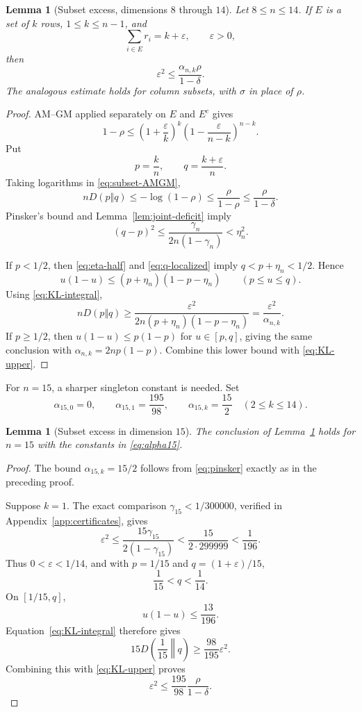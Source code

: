 \documentclass[11pt]{article}
\newtheorem{lemma}[theorem]{Lemma}
\theoremstyle{definition}
\newcommand{\1}{\mathbf{1}}
\newcommand{\eps}{\varepsilon}
\begin{document}
\begin{lemma}[Subset excess, dimensions $8$ through $14$]\label{lem:subset-mid}
Let $8\le n\le14$.  If $E$ is a set of $k$ rows, $1\le k\le n-1$, and
\[
 \sum_{i\in E}r_i=k+\eps,
 \qquad \eps>0,
\]
then
\[
 \eps^2\le\frac{\alpha_{n,k}\rho}{1-\delta}.
 \tag{5.13}\label{eq:subset-mid}
\]
The analogous estimate holds for column subsets, with $\sigma$ in place of $\rho$.
\end{lemma}

\begin{proof}
AM--GM applied separately on $E$ and $E^c$ gives
\[
 1-\rho
 \le
 \left(1+\frac{\eps}{k}\right)^k
 \left(1-\frac{\eps}{n-k}\right)^{n-k}.
 \tag{5.14}\label{eq:subset-AMGM}
\]
Put
\[
 p=\frac{k}{n},
 \qquad
 q=\frac{k+\eps}{n}.
\]
Taking logarithms in \eqref{eq:subset-AMGM},
\[
 nD(p\Vert q)\le-\log(1-\rho)
 \le\frac{\rho}{1-\rho}
 \le\frac{\rho}{1-\delta}.
 \tag{5.15}\label{eq:KL-upper}
\]
Pinsker's bound and Lemma~\ref{lem:joint-deficit} imply
\[
 (q-p)^2
 \le\frac{\gamma_n}{2n(1-\gamma_n)}
 <\eta_n^2.
 \tag{5.16}\label{eq:q-localized}
\]

If $p<1/2$, then \eqref{eq:eta-half} and \eqref{eq:q-localized} imply $q<p+\eta_n<1/2$.  Hence
\[
 u(1-u)\le(p+\eta_n)(1-p-\eta_n)
 \qquad(p\le u\le q).
\]
Using \eqref{eq:KL-integral},
\[
 nD(p\Vert q)
 \ge\frac{\eps^2}
 {2n(p+\eta_n)(1-p-\eta_n)}
 =\frac{\eps^2}{\alpha_{n,k}}.
\]
If $p\ge1/2$, then $u(1-u)\le p(1-p)$ for $u\in[p,q]$, giving the same conclusion with $\alpha_{n,k}=2np(1-p)$.  Combine this lower bound with \eqref{eq:KL-upper}.
\end{proof}

For $n=15$, a sharper singleton constant is needed.  Set
\[
 \alpha_{15,0}=0,
 \qquad
 \alpha_{15,1}=\frac{195}{98},
 \qquad
 \alpha_{15,k}=\frac{15}{2}\quad(2\le k\le14).
 \tag{5.17}\label{eq:alpha15}
\]

\begin{lemma}[Subset excess in dimension $15$]\label{lem:subset15}
The conclusion of Lemma~\ref{lem:subset-mid} holds for $n=15$ with the constants in \eqref{eq:alpha15}.
\end{lemma}

\begin{proof}
The bound $\alpha_{15,k}=15/2$ follows from \eqref{eq:pinsker} exactly as in the preceding proof.

Suppose $k=1$.  The exact comparison $\gamma_{15}<1/300000$, verified in Appendix~\ref{app:certificates}, gives
\[
 \eps^2
 \le\frac{15\gamma_{15}}{2(1-\gamma_{15})}
 <\frac{15}{2\cdot299999}<\frac1{196}.
\]
Thus $0<\eps<1/14$, and with $p=1/15$ and $q=(1+\eps)/15$,
\[
 \frac1{15}<q<\frac1{14}.
\]
On $[1/15,q]$,
\[
 u(1-u)\le\frac{13}{196}.
\]
Equation~\eqref{eq:KL-integral} therefore gives
\[
 15D\left(\frac1{15}\middle\Vert q\right)
 \ge\frac{98}{195}\eps^2.
\]
Combining this with \eqref{eq:KL-upper} proves
\[
 \eps^2\le\frac{195}{98}\frac{\rho}{1-\delta}.
\]
\end{proof}
\end{document}
